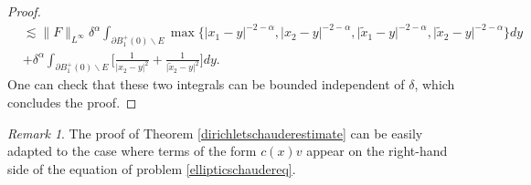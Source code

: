 \documentclass[12pt,a4paper]{article}
\theoremstyle{definition}
\theoremstyle{remark}
\newtheorem{remark}[theorem]{Remark}
\numberwithin{equation}{section}
\begin{document}
\begin{appendices}
\begin{proof}
\begin{align*}
&\lesssim \lVert F \rVert_{L^\infty} \delta^\alpha \int_{\partial B_1^+ (0) \backslash E} \max \{ \lvert x_1 - y \rvert^{-2-\alpha}, \lvert x_2 - y \rvert^{-2-\alpha}, \lvert \widetilde{x}_1 - y \rvert^{-2-\alpha}, \lvert \widetilde{x}_2 - y \rvert^{-2-\alpha} \} dy \\
&+ \delta^\alpha \int_{\partial B_1^+ (0) \backslash E} \bigg[ \frac{1}{\lvert x_2 - y \rvert^2} + \frac{1}{\lvert \widetilde{x}_2 - y \rvert^2} \bigg] dy.
\end{align*}
One can check that these two integrals can be bounded independent of $\delta$, which concludes the proof.
\end{proof}
\begin{remark}
The proof of Theorem \ref{dirichletschauderestimate} can be easily adapted to the case where terms of the form $c(x) v$ appear on the right-hand side of the equation of problem \eqref{ellipticschaudereq}.
\end{remark}


\end{appendices}
\end{document}
